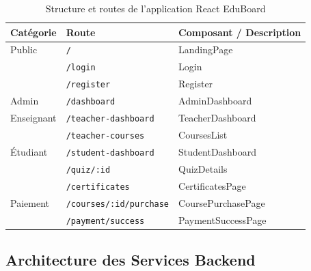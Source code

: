 \begin{table}[H]
  \centering
  \caption{Structure et routes de l'application React EduBoard}
  \label{tab:routes}
  \begin{tabularx}{\textwidth}{llX}
    \toprule
    \textbf{Catégorie} & \textbf{Route} & \textbf{Composant / Description} \\
    \midrule
    Public      & \texttt{/}                    & LandingPage \\
                & \texttt{/login}               & Login \\
                & \texttt{/register}            & Register \\
    Admin       & \texttt{/dashboard}           & AdminDashboard \\
    Enseignant  & \texttt{/teacher-dashboard}   & TeacherDashboard \\
                & \texttt{/teacher-courses}     & CoursesList \\
    Étudiant    & \texttt{/student-dashboard}   & StudentDashboard \\
                & \texttt{/quiz/:id}            & QuizDetails \\
                & \texttt{/certificates}        & CertificatesPage \\
    Paiement    & \texttt{/courses/:id/purchase}& CoursePurchasePage \\
                & \texttt{/payment/success}     & PaymentSuccessPage \\
    \bottomrule
  \end{tabularx}
\end{table}

\subsection{Architecture des Services Backend}

